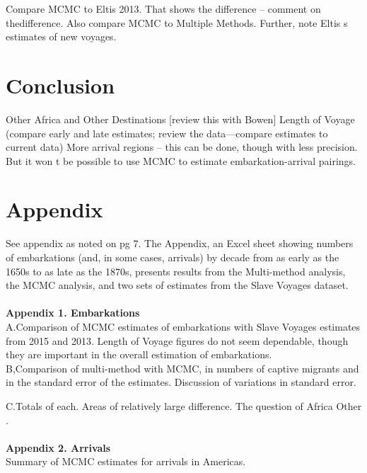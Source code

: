 \documentclass{article}
\begin{document}
Compare MCMC to Eltis 2013. That shows the difference -- comment on thedifference.
Also compare MCMC to Multiple Methods.
Further, note Eltis s estimates of new voyages.\\

\section{Conclusion}
 Other Africa  and  Other Destinations  [review this with Bowen]
Length of Voyage (compare early and late estimates; review the data---compare estimates to current data)
More arrival regions -- this can be done, though with less precision.
But it won t be possible to use MCMC to estimate embarkation-arrival pairings.\\


\section{Appendix}
See  appendix  as noted on pg 7.
The Appendix, an Excel sheet showing numbers of  embarkations (and, in some cases, arrivals) by decade from as early as the 1650s to as late as the 1870s, presents results from the Multi-method analysis, the MCMC analysis, and two sets of estimates from the Slave Voyages dataset.\\
\\
\textbf{Appendix 1. Embarkations}\\
\indent
A.Comparison of MCMC estimates of embarkations with Slave Voyages estimates from 2015 and 2013. Length of Voyage figures do not seem dependable, though they are important in the overall estimation of embarkations.\\

B,Comparison of multi-method with MCMC, in numbers of captive migrants and in the standard error of the estimates. Discussion of variations in standard error.

C.Totals of each. Areas of relatively large difference. The question of  Africa Other .\\
\\
\textbf{Appendix 2. Arrivals}\\
\indent
Summary of MCMC estimates for arrivals in Americas.
\end{document}
